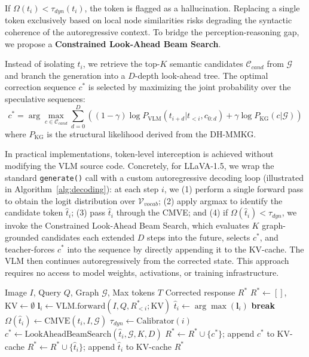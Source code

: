 If $\Omega(t_i) < \tau_{dyn}(t_i)$, the token is flagged as a hallucination. Replacing a single token exclusively based on local node similarities risks degrading the syntactic coherence of the autoregressive context. To bridge the perception-reasoning gap, we propose a \textbf{Constrained Look-Ahead Beam Search}.

Instead of isolating $t_i$, we retrieve the top-$K$ semantic candidates $\mathcal{C}_{cand}$ from $\mathcal{G}$ and branch the generation into a $D$-depth look-ahead tree. The optimal correction sequence $c^*$ is selected by maximizing the joint probability over the speculative sequences:
\begin{equation}
c^* = \arg\max_{c \in \mathcal{C}_{cand}} \sum_{d=0}^{D} \left( (1-\gamma) \log P_{\text{VLM}}(t_{i+d} | t_{<i}, c_{0:d}) + \gamma \log P_{\text{KG}}(c | \mathcal{G}) \right)
\end{equation}
where $P_{\text{KG}}$ is the structural likelihood derived from the DH-MMKG.

In practical implementations, token-level interception is achieved without modifying the VLM source code. Concretely, for LLaVA-1.5, we wrap the standard \texttt{generate()} call with a custom autoregressive decoding loop (illustrated in Algorithm~\ref{alg:decoding}): at each step $i$, we (1) perform a single forward pass to obtain the logit distribution over $\mathcal{V}_{vocab}$; (2) apply argmax to identify the candidate token $\hat{t}_i$; (3) pass $\hat{t}_i$ through the CMVE; and (4) if $\Omega(\hat{t}_i) < \tau_{dyn}$, we invoke the Constrained Look-Ahead Beam Search, which evaluates $K$ graph-grounded candidates each extended $D$ steps into the future, selects $c^*$, and teacher-forces $c^*$ into the sequence by directly appending it to the KV-cache. The VLM then continues autoregressively from the corrected state. This approach requires no access to model weights, activations, or training infrastructure.

\begin{algorithm}[t]
\caption{Autoregressive Decoding with CMVKG-Guard Interception}
\label{alg:decoding}
\begin{algorithmic}[1]
\Require Image $I$, Query $Q$, Graph $\mathcal{G}$, Max tokens $T$
\Ensure Corrected response $R^*$
\State $R^* \gets []$, $\text{KV} \gets \emptyset$
    \State $\mathbf{l}_i \gets \text{VLM.forward}(I, Q, R^*_{<i}; \text{KV})$
    \State $\hat{t}_i \gets \arg\max(\mathbf{l}_i)$
        \State \textbf{break}
    \EndIf
    \State $\Omega(\hat{t}_i) \gets \text{CMVE}(\hat{t}_i, I, \mathcal{G})$
    \State $\tau_{dyn} \gets \text{Calibrator}(i)$
        \State $c^* \gets \text{LookAheadBeamSearch}(\hat{t}_i, \mathcal{G}, K, D)$
        \State $R^* \gets R^* \cup \{ c^* \}$; append $c^*$ to KV-cache
    \Else
        \State $R^* \gets R^* \cup \{ \hat{t}_i \}$; append $\hat{t}_i$ to KV-cache
    \EndIf
\EndFor
\State \Return $R^*$
\end{algorithmic}
\end{algorithm}
